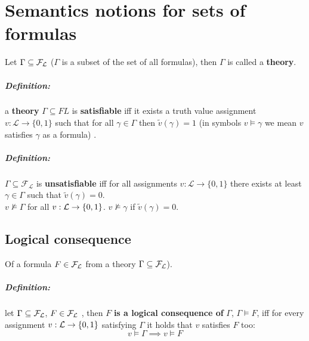 
	\chapter{Semantics notions for sets of formulas}

	Let $\Gamma \subseteq \mathcal{F}_\mathcal{L}$ ($\Gamma$ is a subset of the set of all formulas), then $\Gamma$ is called a \textbf{theory}.\\

	\paragraph{Definition:} a \textbf{theory} $\Gamma \subseteq FL$ is \textbf{satisfiable} iff it exists a truth value assignment $v: \mathcal{L} \rightarrow \{0,1\}$ such that for all $\gamma \in \Gamma$ then $\tilde{v} (\gamma) = 1$ (in symbols $v \models \gamma$ we mean $v$ satisfies $\gamma$ as a formula) .\\

	\paragraph{Definition:} $\Gamma \subseteq \mathcal{F}_\mathcal{L}$ is \textbf{unsatisfiable} iff for all assignments $v: \mathcal{L} \rightarrow \{0,1\}$ there exists at least $\gamma \in \Gamma$ such that $\tilde{v} (\gamma) = 0$.\\

	$v \not \models \Gamma$ for all $v: \mathcal{L} \rightarrow \{0,1\}$. $v \not \models \gamma$ if $\tilde{v} (\gamma) = 0$.\\

	\newpage

	\section{Logical consequence}
	Of a formula $F \in \mathcal{F}_\mathcal{L}$ from a theory $\Gamma \subseteq \mathcal{F}_\mathcal{L}$).\\

	\paragraph{Definition:} let $\Gamma \subseteq \mathcal{F}_\mathcal{L}$, $F \in \mathcal{F}_\mathcal{L}$ , then $F$ \textbf{is a logical consequence of} $\Gamma$, $\Gamma \models F$, iff for every assignment $v: \mathcal{L} \rightarrow \{0,1\}$ satisfying $\Gamma$ it holds that $v$ satisfies $F$ too:
	$$ v \models \Gamma \implies v \models F $$

